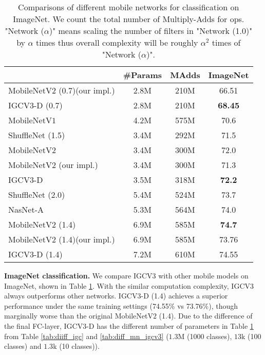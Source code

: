 \documentclass{bmvc2k}
\begin{document}
	\begin{table}[h]
		\centering
		\begin{tabular}{|l||c|c|c|}
			\hline
			& \#Params& MAdds&ImageNet\\
			\hline\hline
			MobileNetV$2$ (0.7)(our impl.)&2.8M& 210M &66.51\\
			IGCV$3$-D (0.7) & 2.8M & 210M & \textbf{68.45} \\
			\hline\hline
			MobileNetV$1$ \cite{howard2017mobilenets}&4.2M&575M&70.6\\
			ShuffleNet (1.5) \cite{zhang2017shufflenet} &3.4M&292M&71.5\\
			MobileNetV$2$ \cite{sandler2018inverted}&3.4M&300M&72.0\\
			MobileNetV$2$ (our impl.) &3.4M&300M&71.3\\
			IGCV3-D & 3.5M & 318M & \textbf{72.2} \\
			\hline\hline
			ShuffleNet (2.0) \cite{zhang2017shufflenet}&5.4M&524M&73.7\\
			NasNet-A \cite{ZophVSL17}&5.3M&564M&74.0\\
			MobileNetV$2$ (1.4) \cite{sandler2018inverted}&6.9M&585M&\textbf{74.7}\\
			MobileNetV$2$ (1.4)(our impl.)&6.9M&585M&73.76\\
			IGCV$3$-D (1.4) & 7.2M  & 610M&74.55 \\
			\hline
		\end{tabular}
		\caption{Comparisons of different mobile networks for classification on ImageNet. We count the total number of Multiply-Adds for ops. "Network ($\alpha$)" means scaling the
			number of filters in "Network (1.0)" by
			$\alpha$ times thus overall
			complexity will be roughly $\alpha^2$
			times of "Network ($\alpha$)".}
		\label{tab:diff_imagenet}
	\end{table}
	\noindent\textbf{ImageNet classification.} We compare IGCV$3$ with other mobile models on ImageNet, shown in Table \ref{tab:diff_imagenet}. With the similar computation complexity, IGCV$3$ always outperforms other networks. IGCV$3$-D (1.4) achieves a superior performance under the same training settings (74.55\% vs 73.76\%), though marginally worse than the original MobileNetV$2$ (1.4). Due to the difference of the final FC-layer, IGCV$3$-D has the different number of parameters in Table \ref{tab:diff_imagenet} from Table \ref{tab:diiff_igc} and \ref{tab:diff_mn_igcv3} ($1.3$M (1000 classes), $13$k (100 classes) and $1.3$k (10 classes)).
\end{document}
